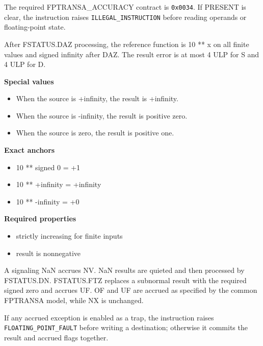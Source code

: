 The required FPTRANSA\_ACCURACY contract is \texttt{0x0034}. If PRESENT is clear, the instruction raises \texttt{ILLEGAL\_INSTRUCTION} before reading operands or floating-point state.

After FSTATUS.DAZ processing, the reference function is 10 ** x on all finite values and signed infinity after DAZ. The result error is at most 4 ULP for S and 4 ULP for D.

\textbf{Special values}\par
\begin{itemize}
\item When the source is +infinity, the result is +infinity.
\item When the source is -infinity, the result is positive zero.
\item When the source is zero, the result is positive one.
\end{itemize}

\textbf{Exact anchors}\par
\begin{itemize}
\item 10 ** signed 0 = +1
\item 10 ** +infinity = +infinity
\item 10 ** -infinity = +0
\end{itemize}

\textbf{Required properties}\par
\begin{itemize}
\item strictly increasing for finite inputs
\item result is nonnegative
\end{itemize}

A signaling NaN accrues NV. NaN results are quieted and then processed by FSTATUS.DN. FSTATUS.FTZ replaces a subnormal result with the required signed zero and accrues UF. OF and UF are accrued as specified by the common FPTRANSA model, while NX is unchanged.

If any accrued exception is enabled as a trap, the instruction raises \texttt{FLOATING\_POINT\_FAULT} before writing a destination; otherwise it commits the result and accrued flags together.
